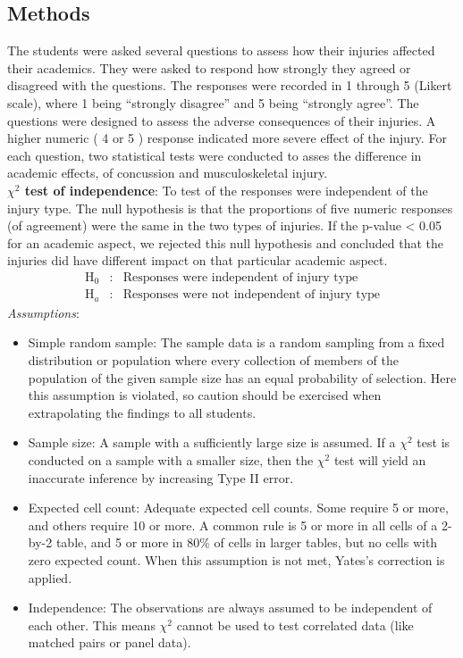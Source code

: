 \documentclass[12]{article}
\begin{document}
\subsection*{Methods}
The students were asked several questions to assess how their injuries affected their academics. They were asked to respond how strongly they agreed or disagreed with the questions. The responses were recorded in 1 through 5 (Likert scale), where 1 being ``strongly disagree'' and 5 being ``strongly agree''. The questions were designed to assess the adverse consequences of their injuries. A higher numeric ( 4 or 5 ) response indicated more severe effect of the injury. For each question, two statistical tests were conducted to asses the difference in academic effects, of concussion and musculoskeletal injury. \\
\noindent
{\bf{$\chi^2$ test of independence}}: To test of the responses were independent of the injury type. The null hypothesis is that the proportions of five numeric responses (of agreement) were the same in the two types of injuries. If the p-value < 0.05 for an academic aspect, we rejected this null hypothesis and concluded that the injuries did have different impact on that particular academic aspect. 
\begin{eqnarray}
\nonumber
\text{H}_0&:& \text{Responses were independent of injury type} \\
\text{H}_a&:& \text{Responses were not independent of injury type} 
\label{eq:chiSqTest}
\end{eqnarray}
\noindent
{\emph{Assumptions}}:
\begin{itemize}
\item Simple random sample: The sample data is a random sampling from a fixed distribution or  population where every collection of members of the population of the given sample size has an equal probability of selection. Here this assumption is violated, so caution should be exercised when extrapolating the findings to all students.
\item Sample size: A sample with a sufficiently large size is assumed. If a $\chi^2$ test is conducted on a sample with a smaller size, then the $\chi^2$ test will yield an inaccurate inference by increasing Type II error.
\item Expected cell count: Adequate expected cell counts. Some require 5 or more, and others require 10 or more. A common rule is 5 or more in all cells of a 2-by-2 table, and 5 or more in 80\% of cells in larger tables, but no cells with zero expected count. When this assumption is not met, Yates's correction is applied.
\item Independence: The observations are always assumed to be independent of each other. This means $\chi^2$ cannot be used to test correlated data (like matched pairs or panel data).
\end{itemize}
\end{document}
